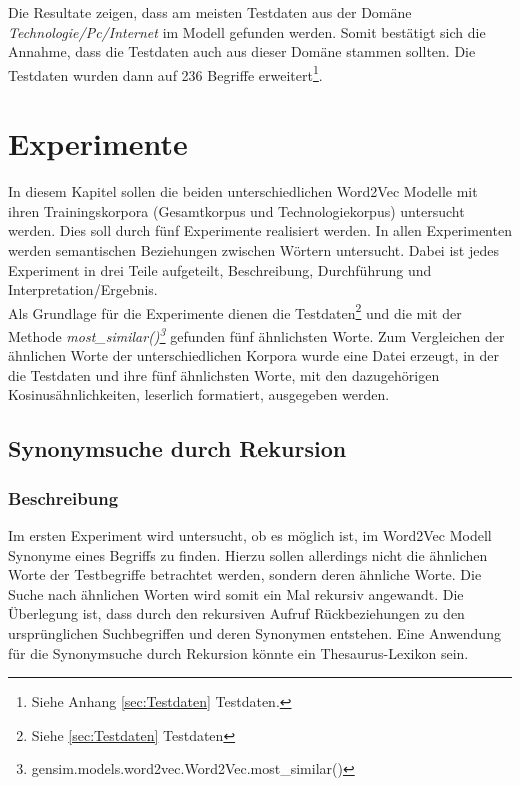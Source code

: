 \documentclass[12pt,a4paper]{report}
\begin{document}
Die Resultate zeigen, dass am meisten Testdaten aus der Domäne \textit{Technologie/Pc/Internet} im Modell gefunden werden.
Somit bestätigt sich die Annahme, dass die Testdaten auch aus dieser Domäne stammen sollten. 
Die Testdaten wurden dann auf 236 Begriffe erweitert\footnote{Siehe Anhang \ref{sec:Testdaten} Testdaten.}.
	
	
\newpage
\chapter{Experimente}
\label{chap:Experimente}
In diesem Kapitel sollen die beiden unterschiedlichen Word2Vec Modelle mit ihren Trainingskorpora (Gesamtkorpus und Technologiekorpus) untersucht werden. Dies soll durch fünf Experimente realisiert werden. In allen Experimenten werden semantischen Beziehungen zwischen Wörtern untersucht. Dabei ist jedes Experiment in drei Teile aufgeteilt, Beschreibung, Durchführung und Interpretation/Ergebnis.\\
Als Grundlage für die Experimente dienen die Testdaten\footnote{Siehe \ref{sec:Testdaten} Testdaten} und die mit der Methode \textit{most\_similar()\footnote{gensim.models.word2vec.Word2Vec.most\_similar()}} gefunden fünf ähnlichsten Worte. Zum Vergleichen der ähnlichen Worte der unterschiedlichen Korpora wurde eine Datei erzeugt, in der die Testdaten und ihre fünf ähnlichsten Worte, mit den dazugehörigen Kosinusähnlichkeiten, leserlich formatiert, ausgegeben werden.\\ 

	\section{Synonymsuche durch Rekursion}
\label{chap:Experiment1}
		\subsection*{Beschreibung}
		Im ersten Experiment wird untersucht, ob es möglich ist, im Word2Vec Modell Synonyme eines Begriffs zu finden. Hierzu sollen allerdings nicht die ähnlichen Worte der Testbegriffe betrachtet werden, sondern deren ähnliche Worte. Die Suche nach ähnlichen Worten wird somit ein Mal rekursiv angewandt. Die Überlegung ist, dass durch den rekursiven Aufruf Rückbeziehungen zu den ursprünglichen Suchbegriffen und deren Synonymen entstehen. Eine Anwendung für die Synonymsuche durch Rekursion könnte ein Thesaurus-Lexikon sein.\\
		
\end{document}
